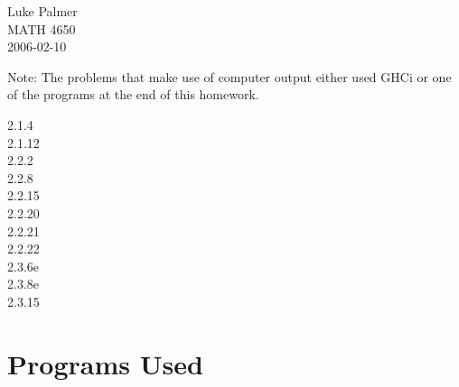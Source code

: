 \documentclass[12pt]{article}
\begin{document}
\noindent
Luke Palmer \\
MATH 4650 \\
2006-02-10

Note: The problems that make use of computer output either used GHCi or
one of the programs at the end of this homework.

\begin{description}
\item[2.1.4]



\item[2.1.12]



\item[2.2.2]



\item[2.2.8]



\item[2.2.15]



\item[2.2.20]



\item[2.2.21]



\item[2.2.22]



\item[2.3.6e]



\item[2.3.8e]   



\item[2.3.15]   


\end{description}

\section*{Programs Used}
\end{document}
